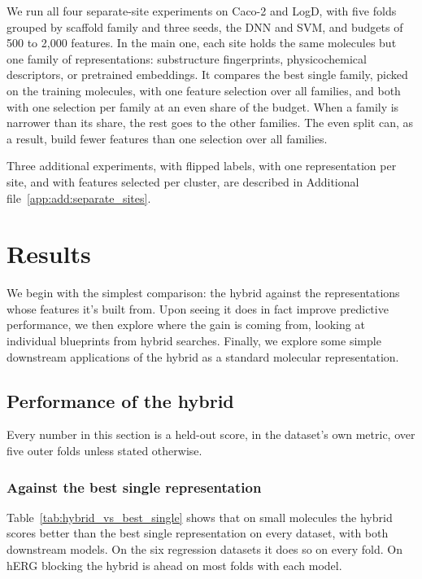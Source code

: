 We run all four separate-site experiments on Caco-2 and LogD, with five folds grouped by scaffold family and three seeds, the DNN and SVM, and budgets of 500 to 2{,}000 features. In the main one, each site holds the same molecules but one family of representations: substructure fingerprints, physicochemical descriptors, or pretrained embeddings. It compares the best single family, picked on the training molecules, with one feature selection over all families, and both with one selection per family at an even share of the budget. When a family is narrower than its share, the rest goes to the other families. The even split can, as a result, build fewer features than one selection over all families. 


Three additional experiments, with flipped labels, with one representation per site, and with features selected per cluster, are described in Additional file~\ref{app:add:separate_sites}.


\section{Results}

We begin with the simplest comparison: the hybrid against the representations whose features it's built from. Upon seeing it does in fact improve predictive performance, we then explore where the gain is coming from, looking at individual blueprints from hybrid searches. Finally, we explore some simple downstream applications of the hybrid as a standard molecular representation.

\subsection{Performance of the hybrid}\label{sec:method:results_single}

Every number in this section is a held-out score, in the dataset's own metric, over five outer folds unless stated otherwise.

\subsubsection{Against the best single representation}


Table~\ref{tab:hybrid_vs_best_single} shows that on small molecules the hybrid scores better than the best single representation on every dataset, with both downstream models. On the six regression datasets it does so on every fold. On hERG blocking the hybrid is ahead on most folds with each model.

